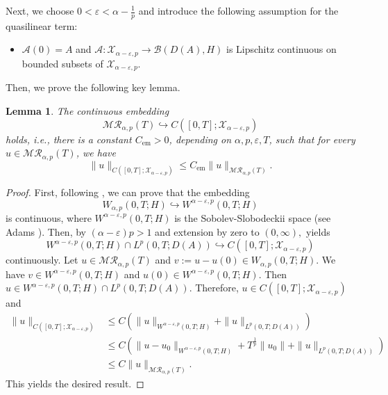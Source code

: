 \documentclass[reqno]{amsart}
\newtheorem{lem}[theorem]{Lemma}
\numberwithin{equation}{section}
\begin{document}
Next, we choose $0<\varepsilon<\alpha-\frac{1}{p}$ and introduce the following assumption for the quasilinear term:
\begin{itemize}
    \item[\textbf{(H$_\varepsilon$)}] $\mathcal{A}(0)=A$ and $\mathcal{A}\colon \mathcal{X}_{\alpha-\varepsilon,p} \to \mathcal{B}(D(A),H)$ is Lipschitz continuous on bounded subsets of $\mathcal{X}_{\alpha-\varepsilon,p}$.
\end{itemize}
Then, we prove the following key lemma.
\begin{lem}
The continuous embedding
\[
\mathcal{M}\mathcal{R}_{\alpha,p}(T)
\hookrightarrow C\left([0,T];\mathcal{X}_{\alpha-\varepsilon,p}\right)
\]
holds, i.e., there is a constant \(C_\mathrm{em}>0\), depending on \(\alpha,p,\varepsilon,T\), such that for every
\(u\in \mathcal{M}\mathcal{R}_{\alpha,p}(T)\), we have
\begin{equation}\label{emb}
\|u\|_{C([0,T];\mathcal{X}_{\alpha-\varepsilon,p})}
\le C_\mathrm{em} \|u\|_{\mathcal{M}\mathcal{R}_{\alpha,p}(T)}.
\end{equation}
\end{lem}
\begin{proof}
First, following \cite[Theorem 2.1~(i)]{YaLp22}, we can prove that the embedding
\begin{equation}\label{SSlob}
W_{\alpha,p}(0,T;H) \hookrightarrow W^{\alpha-\varepsilon,p}(0,T;H)
\end{equation}
is continuous, where $W^{\alpha-\varepsilon,p}(0,T;H)$ is the Sobolev-Slobodeckii space (see Adams \cite{Ad75}). Then, by $(\alpha-\varepsilon)p>1$ and extension by zero to $(0,\infty),$ \cite[Theorem 1.2]{Ve23} yields
$$W^{\alpha-\varepsilon,p}(0,T;H)\cap L^p(0,T;D(A))
\hookrightarrow
C\left([0,T];\mathcal{X}_{\alpha-\varepsilon,p}\right)$$
continuously. Let $u\in \mathcal{M}\mathcal{R}_{\alpha,p}(T)$ and $v:=u-u(0)\in W_{\alpha,p}(0,T;H)$. We have $v\in W^{\alpha-\varepsilon,p}(0,T;H)$ and $u(0)\in W^{\alpha-\varepsilon,p}(0,T;H).$ Then $u\in W^{\alpha-\varepsilon,p}(0,T;H)\cap L^p(0,T;D(A)).$ Therefore, $u\in C\left([0,T];\mathcal{X}_{\alpha-\varepsilon,p}\right)$ and
\begin{align*}
\|u\|_{C\left([0,T];\mathcal{X}_{\alpha-\varepsilon,p}\right)} & \le C \left(\|u\|_{W^{\alpha-\varepsilon,p}(0,T;H)}+\|u\|_{L^p(0,T;D(A))}\right)\\
& \le C \left(\|u-u_0\|_{W^{\alpha-\varepsilon,p}(0,T;H)}+T^{\frac{1}{p}}\|u_0\|+\|u\|_{L^p(0,T;D(A))}\right)\\
&\le C \|u\|_{\mathcal{M}\mathcal{R}_{\alpha,p}(T)}.
\end{align*}
This yields the desired result.
\end{proof}
\end{document}
